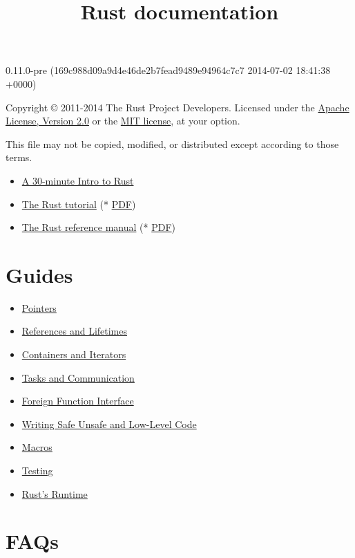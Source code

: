 \documentclass[]{article}
\title{Rust documentation}
\begin{document}
\maketitle

0.11.0-pre (169c988d09a9d4e46de2b7fead9489e94964c7c7 2014-07-02 18:41:38 +0000)

Copyright © 2011-2014 The Rust Project Developers. Licensed under the
\href{http://www.apache.org/licenses/LICENSE-2.0}{Apache License,
Version 2.0} or the \href{http://opensource.org/licenses/MIT}{MIT
license}, at your option.

This file may not be copied, modified, or distributed except according
to those terms.

{
\hypersetup{linkcolor=black}
\setcounter{tocdepth}{3}
\tableofcontents
}
\begin{itemize}
\itemsep1pt\parskip0pt
\item
  \href{intro.html}{A 30-minute Intro to Rust}
\item
  \href{tutorial.html}{The Rust tutorial} (* \href{tutorial.pdf}{PDF})
\item
  \href{rust.html}{The Rust reference manual} (* \href{rust.pdf}{PDF})
\end{itemize}

\section{Guides}\label{guides}

\begin{itemize}
\itemsep1pt\parskip0pt
\item
  \href{guide-pointers.html}{Pointers}
\item
  \href{guide-lifetimes.html}{References and Lifetimes}
\item
  \href{guide-container.html}{Containers and Iterators}
\item
  \href{guide-tasks.html}{Tasks and Communication}
\item
  \href{guide-ffi.html}{Foreign Function Interface}
\item
  \href{guide-unsafe.html}{Writing Safe Unsafe and Low-Level Code}
\item
  \href{guide-macros.html}{Macros}
\item
  \href{guide-testing.html}{Testing}
\item
  \href{guide-runtime.html}{Rust's Runtime}
\end{itemize}

\section{FAQs}\label{faqs}
\end{document}
